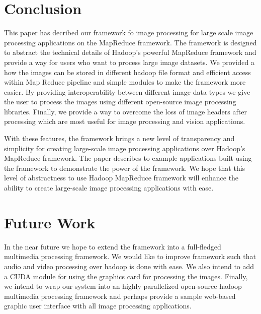\documentclass[conference]{IEEEtran}
\begin{document}
\section{Conclusion}
This paper has decribed our framework fo image processing for large scale image processing applications on the MapReduce framework. The framework is designed to abstract the technical details of Hadoop's powerful MapReduce framework and provide a way for users who want to process large image datasets. We provided a how the images can be stored in different hadoop file format and efficient access within Map Reduce pipeline and simple modules to make the framework more easier. By providing interoperability between different image data types we give the user to process the images using different open-source image processing libraries. Finally, we provide a way to overcome the loss of image headers after processing which are most useful for image processing and vision applications.

With these features, the framework brings a new level of transparency and simplicity for creating large-scale image processing applications over Hadoop's MapReduce framework. The paper describes to example applications built using the framework to demonstrate the power of the framework. We hope that this level of abstractness to use Hadoop MapReduce framework will enhance the ability to create large-scale image processing applications with ease.

\section{Future Work}
In the near future we hope to extend the framework into a full-fledged multimedia processing framework. We would like to improve framework such that audio and video processing over hadoop is done with ease. We also intend to add a CUDA module for using the graphics card for processing the images. Finally, we intend to wrap our system into an highly parallelized open-source hadoop multimedia processing framework and perhaps provide a sample web-based graphic user interface with all image processing applications.  

	
	
\end{document}

